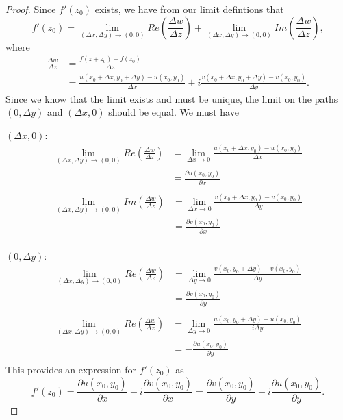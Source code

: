 \documentclass[12pt]{book}
\begin{document}
\begin{proof}
    Since $f'(z_0)$ exists, we have from our limit defintions that
    $$
        f'(z_0) = \lim_{(\Delta x, \Delta y) \rightarrow (0, 0)} Re\left(\frac{\Delta w}{\Delta z}\right) + \lim_{(\Delta x, \Delta y) \rightarrow (0, 0)} Im\left(\frac{\Delta w}{\Delta z}\right),
    $$
    where 
    \begin{align*}
        \frac{\Delta w}{\Delta z}
            &=
                \frac{f(z + z_0) - f(z_0)}{\Delta z} \\
            &=
                \frac{u(x_0 + \Delta x, y_0 + \Delta y) - u(x_0, y_0)}{\Delta x} + i\frac{v(x_0 + \Delta x, y_0 + \Delta y) - v(x_0, y_0)}{\Delta y}.
    \end{align*} 
    Since we know that the limit exists and must be unique, the limit on the paths $(0, \Delta y)$ and $(\Delta x, 0)$ should be equal. We must have

    \noindent $(\Delta x, 0):$
    \begin{align*}
        \lim_{(\Delta x, \Delta y) \rightarrow (0, 0)} Re\left(\frac{\Delta w}{\Delta z}\right)
            &= 
                \lim_{\Delta x \rightarrow 0} \frac{u(x_0 + \Delta x, y_0) - u(x_0, y_0)}{\Delta x} \\
            &=
                \frac{\partial u(x_0, y_0)}{\partial x} \\
    \end{align*}
    \begin{align*}
        \lim_{(\Delta x, \Delta y) \rightarrow (0, 0)} Im\left(\frac{\Delta w}{\Delta z}\right)
            &= 
                \lim_{\Delta x \rightarrow 0} \frac{v(x_0 + \Delta x, y_0) - v(x_0, y_0)}{\Delta y} \\
            &=
            \frac{\partial v(x_0, y_0)}{\partial x} \\
    \end{align*}

    \noindent $(0, \Delta y):$
    \begin{align*}
        \lim_{(\Delta x, \Delta y) \rightarrow (0, 0)} Re\left(\frac{\Delta w}{\Delta z}\right)
            &= 
                \lim_{\Delta y \rightarrow 0} \frac{v(x_0, y_0 + \Delta y) - v(x_0, y_0)}{\Delta y} \\
            &=
                \frac{\partial v(x_0, y_0)}{\partial y} \\
    \end{align*}
    \begin{align*}
        \lim_{(\Delta x, \Delta y) \rightarrow (0, 0)} Re\left(\frac{\Delta w}{\Delta z}\right)
            &= 
                \lim_{\Delta y \rightarrow 0} \frac{u(x_0, y_0 + \Delta y) - u(x_0, y_0)}{i\Delta y} \\
            &=
                -\frac{\partial u(x_0, y_0)}{\partial y} \\
    \end{align*}
    This provides an expression for $f'(z_0)$ as 
    $$
        f'(z_0) = \frac{\partial u(x_0, y_0)}{\partial x} + i \frac{\partial v(x_0, y_0)}{\partial x} = \frac{\partial v(x_0, y_0)}{\partial y} - i \frac{\partial u(x_0, y_0)}{\partial y}. 
    $$
\end{proof}
\end{document}
